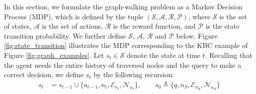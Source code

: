 \documentclass{article}
\newcommand{\defeq}{\triangleq}
\newcommand{\mc}{\mathcal}
\newcommand{\modelname}{M-Walk}
\begin{document}
	In this section, we formulate the graph-walking problem as a Markov Decision Process (MDP), which is defined by the tuple $(\mc{S}, \mc{A}, \mc{R}, \mc{P})$, where $\mc{S}$ is the set of states, $\mc{A}$ is the set of actions, $\mc{R}$ is the reward function, and $\mc{P}$ is the state transition probability. We further define $\mc{S}$, $\mc{A}$, $\mc{R}$ and $\mc{P}$ below. Figure \ref{fig:state_transition} illustrates the MDP corresponding to the KBC example of Figure \ref{fig:graph_examples}. Let $s_t \in \mc{S}$ denote the state at time $t$. Recalling that the agent needs the entire history of traversed nodes and the query to make a correct decision, we define $s_t$ by the following recursion:
\begin{align}
    	    s_t	    &=	    
    	                s_{t-1} \cup \{a_{t-1}, n_t, \mc{E}_{n_t}, \mc{N}_{n_t}\}, \qquad s_0 \defeq \{q, n_S, \mc{E}_{n_S}, \mc{N}_{n_S}\}
    	\label{Equ:\modelname:s_t1}
    	\end{align}
\end{document}
